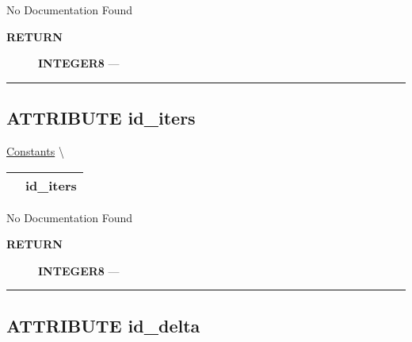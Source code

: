 \par





No Documentation Found








\par
\begin{description}
\item [\colorbox{tagtype}{\color{white} \textbf{\textsf{RETURN}}}] \textbf{INTEGER8} --- 
\end{description}




\rule{\linewidth}{0.5pt}
\subsection*{\textsf{\colorbox{headtoc}{\color{white} ATTRIBUTE}
id\_iters}}

\hypertarget{ecldoc:logisticregression.constants.id_iters}{}
\hspace{0pt} \hyperlink{ecldoc:LogisticRegression.Constants}{Constants} \textbackslash 

{\renewcommand{\arraystretch}{1.5}
\begin{tabularx}{\textwidth}{|>{\raggedright\arraybackslash}l|X|}
\hline
\hspace{0pt}\mytexttt{\color{red} } & \textbf{id\_iters} \\
\hline
\end{tabularx}
}

\par





No Documentation Found








\par
\begin{description}
\item [\colorbox{tagtype}{\color{white} \textbf{\textsf{RETURN}}}] \textbf{INTEGER8} --- 
\end{description}




\rule{\linewidth}{0.5pt}
\subsection*{\textsf{\colorbox{headtoc}{\color{white} ATTRIBUTE}
id\_delta}}

